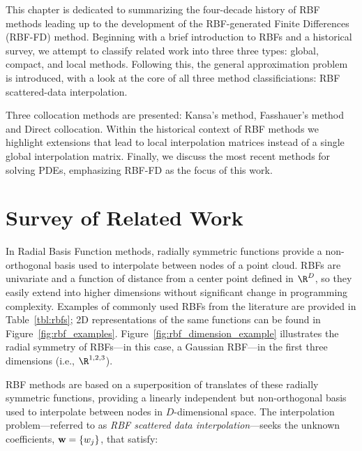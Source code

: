 \documentclass{report}
\begin{document}
{This chapter is dedicated to summarizing the four-decade history of RBF methods leading up to the development of the 
RBF-generated Finite Differences (RBF-FD) method. Beginning with a brief introduction to RBFs and a historical survey, we attempt to classify related work into three three types: global, compact, and local methods. Following this, the general approximation problem is introduced, with a look at the core of all three method classificiations: RBF scattered-data interpolation. %

Three collocation methods are presented: Kansa's method, Fasshauer's method and Direct collocation. Within the historical context of RBF methods we highlight extensions that lead to local interpolation matrices instead of a single global interpolation matrix. Finally, we discuss the most recent methods for solving PDEs, emphasizing RBF-FD as the focus of this work. 

\section{Survey of Related Work}

In Radial Basis Function methods, radially symmetric functions provide a non-orthogonal basis used to interpolate between 
nodes of a point cloud. RBFs are univariate and a function of distance from a center point defined in $\R^D$, so 
they easily extend into higher dimensions without significant change in programming complexity. Examples of commonly used RBFs from the literature are provided in Table~\ref{tbl:rbfs}; 2D representations of the same functions can be found in Figure~\ref{fig:rbf_examples}. 
Figure~\ref{fig:rbf_dimension_example} illustrates the radial symmetry of RBFs---in this case, a Gaussian RBF---in the first three dimensions (i.e., $\R^{1,2,3}$). 

RBF methods are based on a superposition of translates of these radially symmetric functions, providing a linearly independent but non-orthogonal basis used to interpolate between nodes in $D$-dimensional space. The interpolation problem---referred to as \emph{RBF scattered data interpolation}---seeks the unknown coefficients, $\mathbf{w} = \{w_j\}$, that satisfy: 
 
}
\end{document}
